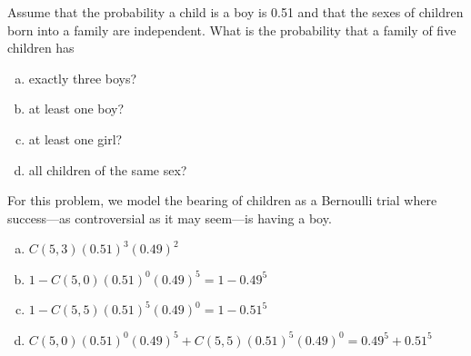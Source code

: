 \documentclass[../main.tex]{subfiles}
\begin{document}
Assume that the probability a child is a boy is 0.51 and that the sexes of children born into a family are independent.
What is the probability that a family of five children has
\begin{enumerate}[a)]
	\item exactly three boys?
	\item at least one boy?
	\item at least one girl?
	\item all children of the same sex?
\end{enumerate}

\solution
For this problem, we model the bearing of children as a Bernoulli trial where success---as controversial as it may seem---is having a boy.
\begin{enumerate}[a)]
	\item $C(5, 3)(0.51)^3(0.49)^2$
	\item $1 - C(5, 0)(0.51)^0(0.49)^5 = 1 - 0.49^5$
	\item $1 - C(5, 5)(0.51)^5(0.49)^0 = 1 - 0.51^5$
	\item $C(5, 0)(0.51)^0(0.49)^5 + C(5, 5)(0.51)^5(0.49)^0 = 0.49^5 + 0.51^5$
\end{enumerate}
\end{document}

